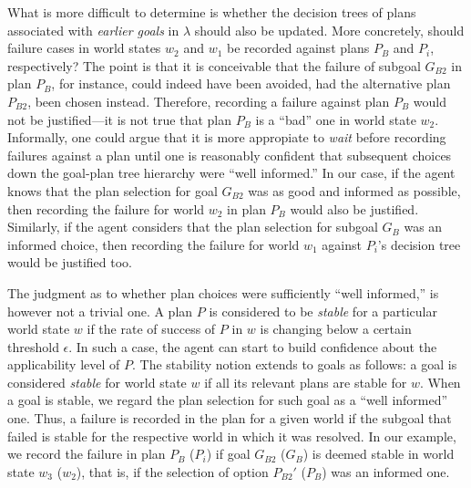 What is more difficult to determine is whether the decision trees of plans
associated with \emph{earlier goals} in $\lambda$ should also be updated.
More concretely, should failure cases in world states $w_2$ and $w_1$ be recorded
against plans $P_B$ and $P_i$, respectively?
The point is that it is conceivable that the failure of subgoal $G_{B2}$ in plan
$P_B$, for instance, could indeed have been avoided, had the alternative plan
$P_{B2}$, been chosen instead. Therefore, recording a failure against plan $P_B$
would not be justified---it is not true that plan $P_{B}$ is a ``bad'' one
in world state $w_2$.
Informally, one could argue that it is more appropiate to \emph{wait} before
recording failures against a plan until one is reasonably confident that
subsequent choices down the goal-plan tree hierarchy were ``well informed.'' In
our case, if the agent knows that the plan selection for goal $G_{B2}$ was as
good and informed as possible, then recording the failure for world $w_2$ in plan
$P_B$ would also be justified. Similarly, if the agent considers that the plan
selection for subgoal $G_B$ was an informed choice, then recording the failure
for world $w_1$ against $P_i$'s decision tree would be justified too.


\newcommand{\procedurefont}[1]{\mathsf{#1}}
\newcommand{\StableGoal}{\procedurefont{StableGoal}}
\newcommand{\RecordTrace}{\procedurefont{RecordFailedTrace}}
\newcommand{\RecordWorldDT}{\procedurefont{RecordWorldDT}}




The judgment as to whether plan choices were sufficiently ``well informed,'' is
however not a trivial one.  A plan $P$ is considered to be \emph{stable} for a
particular world state $w$ if the rate of success of $P$ in $w$ is changing below
a certain threshold $\epsilon$. In such a case, the agent can start to build
confidence about the applicability level of $P$. The stability notion extends to
goals as follows: a goal is considered \emph{stable} for world state $w$ if all
its relevant plans are stable for $w$.
When a goal is stable, we regard the plan selection for such goal as a ``well
informed'' one. Thus, a failure is recorded in the plan for a given world if the subgoal that failed is stable for the respective world in which it was resolved. In our example, we
record the failure in plan $P_B$ ($P_i$) if goal $G_{B2}$ ($G_B$) is deemed stable
in world state $w_3$ ($w_2$), that is, if the selection of option $P_{B2}'$
($P_B$) was an informed one.



